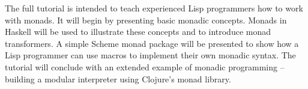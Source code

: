\documentclass[natbib,10pt]{sigplanconf}
\begin{document}
The full tutorial is intended to teach experienced Lisp programmers
how to work with monads.  It will begin by presenting basic monadic
concepts.  Monads in Haskell will be used to illustrate these concepts
and to introduce monad transformers.  A simple Scheme monad package
will be presented to show how a Lisp programmer can use macros to
implement their own monadic syntax.  The tutorial will conclude with
an extended example of monadic programming -- building a modular
interpreter using Clojure's monad library.







\end{document}
